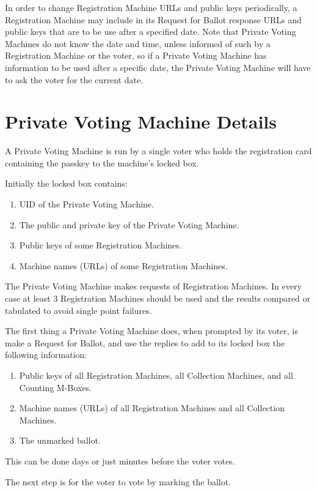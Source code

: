 \documentclass[12pt]{article}
\begin{document}
In order to change Registration Machine URLs and public keys
periodically, a Registration Machine may include
in its Request for Ballot response
URLs and public keys that are to be use after a specified date.
Note that Private Voting Machines do not know the date and time,
unless informed of such by a Registration Machine or the voter,
so if a Private Voting Machine has information 
to be used after a specific date, the Private Voting Machine
will have to ask the voter for the current date.


\section{Private Voting Machine Details}

A Private Voting Machine is run by a single voter
who holds the registration card containing the passkey to
the machine's locked box.

Initially the locked box contains:
\begin{enumerate}
\item UID of the Private Voting Machine.
\item The public and private key of the Private Voting Machine.
\item Public keys of some Registration Machines.
\item Machine names (URLs) of some Registration Machines.
\setcounter{PVM-COUNTER}{\value{enumi}}
\end{enumerate}

The Private Voting Machine
makes requests of Registration Machines.  In every case
at least 3 Registration Machines should be used and the
results compared or tabulated to avoid single point failures.

The first thing a Private Voting Machine does, when prompted by
its voter, is make a Request for Ballot, and use the replies to
add to its locked box the following information:
\begin{enumerate}
\setcounter{enumi}{\value{PVM-COUNTER}}
\item Public keys of all Registration Machines, all Collection
Machines, and all Counting M-Boxes.
\item Machine names (URLs) of all Registration Machines and all Collection
Machines.
\item The unmarked ballot.
\end{enumerate}
This can be done days or just minutes before the voter votes.

The next step is for the voter to vote by marking the ballot.
\end{document}
